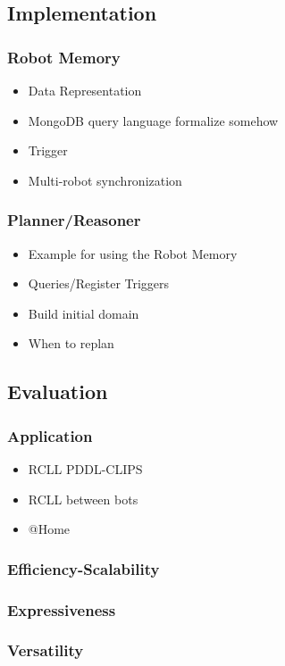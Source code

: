\documentclass[a4paper,11pt]{article}
\begin{document}
\subsection{Implementation}
\label{sec:impl}
\subsubsection{Robot Memory}
\label{sec:impl-memory}
\begin{itemize}
\item Data Representation
\item MongoDB query language formalize somehow
\item Trigger
\item Multi-robot synchronization
\end{itemize}

\subsubsection{Planner/Reasoner}
\label{sec:impl-planner}
\begin{itemize}
\item Example for using the Robot Memory
\item Queries/Register Triggers
\item Build initial domain
\item When to replan
\end{itemize}

\subsection{Evaluation}
\label{sec:eval}
\subsubsection{Application}
\label{sec:eval-apl}
\begin{itemize}
\item RCLL PDDL-CLIPS
\item RCLL between bots
\item @Home
\end{itemize}
\subsubsection{Efficiency-Scalability}
\subsubsection{Expressiveness}
\subsubsection{Versatility}
\end{document}
